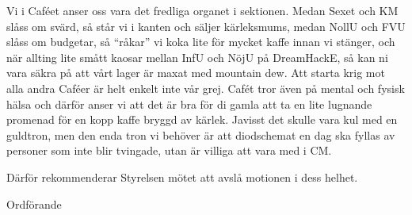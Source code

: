 \documentclass[../_main/handlingar.tex]{subfiles}
\begin{document}
\motionssvar

Vi i Caféet anser oss vara det fredliga organet i sektionen. Medan Sexet och KM slåss om svärd, så står vi i kanten och säljer kärleksmums, medan NollU och FVU slåss om budgetar, så “råkar” vi koka lite för mycket kaffe innan vi stänger, och när allting lite smått kaosar mellan InfU och NöjU på DreamHackE, så kan ni vara säkra på att vårt lager är maxat med mountain dew. Att starta krig mot alla andra Caféer är helt enkelt inte vår grej. Cafét tror även på mental och fysisk hälsa och därför anser vi att det är bra för di gamla att ta en lite lugnande promenad för en kopp kaffe bryggd av kärlek. Javisst det skulle vara kul med en guldtron, men den enda tron vi behöver är att diodschemat en dag ska fyllas av personer som inte blir tvingade, utan är villiga att vara med i CM.

Därför rekommenderar Styrelsen mötet att avslå motionen i dess helhet.

\begin{signatures}{1}
    \ist
    \signature{\ordf}{Ordförande}
\end{signatures}
\end{document}
